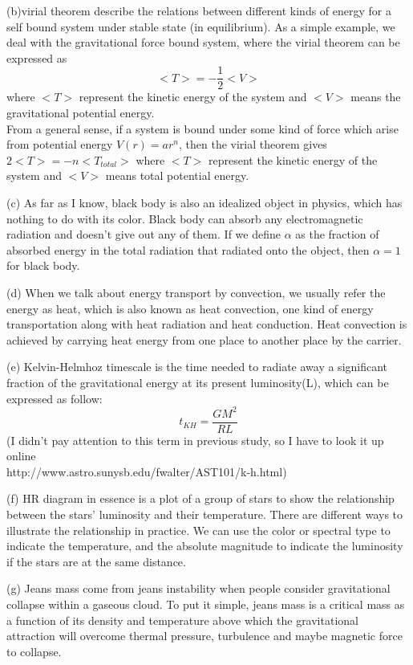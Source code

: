 \documentclass[11pt]{article}
\begin{document}
\begin{CJK}{UTF8}{gbsn}
  (b)virial theorem describe the relations between different kinds of energy for a self bound system under stable state (in equilibrium). As a simple example, we deal with the gravitational force bound system, where the virial theorem can be expressed  as $$<T> = -\frac{1}{2}<V>$$ where $<T>$ represent the kinetic energy of the system and $<V>$ means the gravitational  potential energy. \\ From a general sense, if a system is bound under some kind of force which arise from potential energy $V(r) = ar^n$, then the virial theorem gives $2<T> = -n <T_{total}>$ where $<T>$ represent the kinetic energy of the system and $<V>$ means total potential energy.

	(c) As far as I know, black body is also an idealized object in physics, which has nothing to do with its color. Black body can absorb any electromagnetic radiation and doesn't give out any of them. If we define $\alpha$ as the fraction of absorbed energy in the total radiation that radiated onto the object, then $\alpha =1$ for black body.
	
	(d) When we talk about energy transport by convection, we usually refer the energy as heat, which is also known as heat convection, one kind of energy transportation along with heat radiation and heat conduction. Heat convection is achieved by carrying heat energy from one place to another place by the carrier.
	
	(e) Kelvin-Helmhoz timescale is the time needed to radiate away a significant fraction of the gravitational energy at its present luminosity(L), which can be expressed as follow:$$t_{KH} = \frac{GM^2}{RL}$$
	(I didn't pay attention to this term in previous study, so I have to look it up online\\ http://www.astro.sunysb.edu/fwalter/AST101/k-h.html)
	
	(f) HR diagram in essence is a plot of a group of stars to show the relationship between the stars' luminosity and their temperature. There are different ways to illustrate the relationship in practice. We can use the color or spectral type to indicate the temperature, and the absolute magnitude to indicate the luminosity if the stars are at the same distance.
	
	(g) Jeans mass come from jeans instability when people consider gravitational collapse within a gaseous cloud. To put it simple, jeans mass is a 
 critical mass as a function of its density and temperature above which the gravitational attraction will overcome thermal pressure, turbulence and maybe magnetic force to collapse. 
	

\end{CJK}
\end{document}
